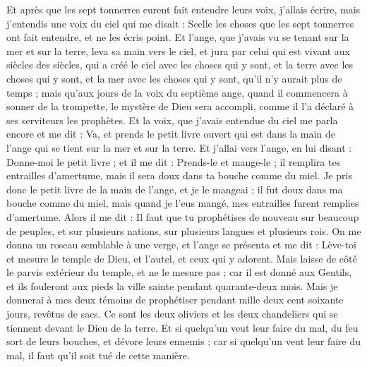\begin{multicols}{2}
Et après que les sept tonnerres eurent fait entendre leurs voix, j'allais écrire, mais j'entendis une voix du ciel qui me disait : Scelle les choses que les sept tonnerres ont fait entendre, et ne les écris point.
Et l'ange, que j'avais vu se tenant sur la mer et sur la terre, leva sa main vers le ciel,
et jura par celui qui est vivant aux siècles des siècles, qui a créé le ciel avec les choses qui y sont, et la terre avec les choses qui y sont, et la mer avec les choses qui y sont, qu'il n'y aurait plus de temps ;
mais qu'aux jours de la voix du septième ange, quand il commencera à sonner de la trompette, le mystère de Dieu sera accompli, comme il l'a déclaré à ses serviteurs les prophètes.
Et la voix, que j'avais entendue du ciel me parla encore et me dit : Va, et prends le petit livre ouvert qui est dans la main de l'ange qui se tient sur la mer et sur la terre.
Et j'allai vers l'ange, en lui disant : Donne-moi le petit livre ; et il me dit : Prends-le et mange-le ; il remplira tes entrailles d'amertume, mais il sera doux dans ta bouche comme du miel.
Je pris donc le petit livre de la main de l'ange, et je le mangeai ; il fut doux dans ma bouche comme du miel, mais quand je l'eus mangé, mes entrailles furent remplies d'amertume.
Alors il me dit : Il faut que tu prophétises de nouveau sur beaucoup de peuples, et sur plusieurs nations, sur plusieurs langues et plusieurs rois.
\VerseOne{}On me donna un roseau semblable à une verge, et l'ange se présenta et me dit : Lève-toi et mesure le temple de Dieu, et l'autel, et ceux qui y adorent.
Mais laisse de côté le parvis extérieur du temple, et ne le mesure pas ; car il est donné aux Gentils, et ils fouleront aux pieds la ville sainte pendant quarante-deux mois.
Mais je donnerai à mes deux témoins de prophétiser pendant mille deux cent soixante jours, revêtus de sacs.
Ce sont les deux oliviers et les deux chandeliers qui se tiennent devant le Dieu de la terre. 
Et si quelqu'un veut leur faire du mal, du feu sort de leurs bouches, et dévore leurs ennemis ; car si quelqu'un veut leur faire du mal, il faut qu'il soit tué de cette manière.

\end{multicols}
